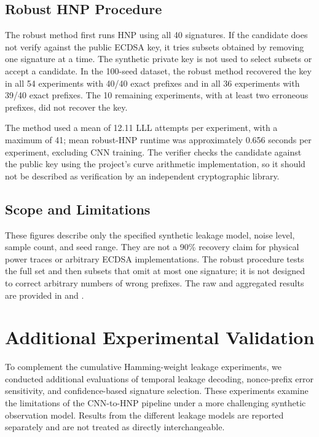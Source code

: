\documentclass[11pt,a4paper]{article}
\begin{document}
\subsection{Robust HNP Procedure}

The robust method first runs HNP using all 40 signatures. If the candidate does not verify against the public ECDSA key, it tries subsets obtained by removing one signature at a time. The synthetic private key is not used to select subsets or accept a candidate. In the 100-seed dataset, the robust method recovered the key in all 54 experiments with 40/40 exact prefixes and in all 36 experiments with 39/40 exact prefixes. The 10 remaining experiments, with at least two erroneous prefixes, did not recover the key.

The method used a mean of 12.11 LLL attempts per experiment, with a maximum of 41; mean robust-HNP runtime was approximately 0.656 seconds per experiment, excluding CNN training. The verifier checks the candidate against the public key using the project's curve arithmetic implementation, so it should not be described as verification by an independent cryptographic library.

\subsection{Scope and Limitations}

These figures describe only the specified synthetic leakage model, noise level, sample count, and seed range. They are not a 90\% recovery claim for physical power traces or arbitrary ECDSA implementations. The robust procedure tests the full set and then subsets that omit at most one signature; it is not designed to correct arbitrary numbers of wrong prefixes. The raw and aggregated results are provided in  and .

\section{Additional Experimental Validation}
\label{sec:additional-validation}

To complement the cumulative Hamming-weight leakage experiments,
we conducted additional evaluations of temporal leakage decoding,
nonce-prefix error sensitivity, and confidence-based signature
selection. These experiments examine the limitations of the
CNN-to-HNP pipeline under a more challenging synthetic observation
model. Results from the different leakage models are reported
separately and are not treated as directly interchangeable.
\end{document}
